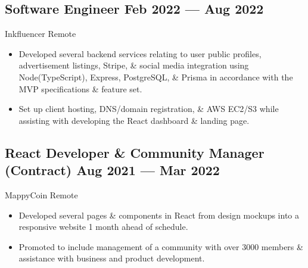 \documentclass[a4,10pt]{article}
\newcommand{\subtext}[1]{
#1\par\vspace{-0.2cm}}
\newenvironment{zitemize}{
\begin{itemize}\itemsep0pt \parskip0pt \parsep1pt}
{\end{itemize}\vspace{-0.5cm}}
\begin{document}

\subsection*{Software Engineer {\normalsize \normalfont} \hfill  Feb 2022 --- Aug 2022 }
\subtext{Inkfluencer \hfill Remote }  
    \begin{zitemize}
        \item Developed several backend services relating to user public profiles, advertisement listings, Stripe, \& social media integration using Node(TypeScript), Express, PostgreSQL, \& Prisma in accordance with the MVP specifications \& feature set.
        \item Set up client hosting, DNS/domain registration, \& AWS EC2/S3 while assisting with developing the React dashboard \& landing page.
    \end{zitemize}


\subsection*{React Developer \& Community Manager {\normalsize \normalfont(Contract) } \hfill  Aug 2021 --- Mar 2022 }
\subtext{MappyCoin \hfill Remote } 
    \begin{zitemize}
        \item Developed several pages \& components in React from design mockups into a responsive website 1 month ahead of schedule.
        \item Promoted to include management of a community with over 3000 members \& assistance with business and product development.
    \end{zitemize}

\end{document}
